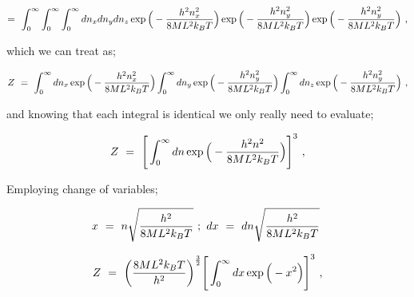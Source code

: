 \documentclass{article}
\begin{document}
\begin{equation} \label{eq:256}
= \hspace{0.125cm} \int_{0}^{\infty} \int_{0}^{\infty} \int_{0}^{\infty} d n_x d n_y d n_z \exp{\Big(-\frac{h^2 n_x^2}{8 M L^2 k_B T} \Big)} \exp{\Big(-\frac{h^2 n_y^2}{8 M L^2 k_B T} \Big)} \exp{\Big(-\frac{h^2 n_y^2}{8 M L^2 k_B T} \Big)} \hspace{0.125cm} ,
\end{equation}

which we can treat as;

\begin{equation} \label{eq:256}
Z \hspace{0.125cm} = \hspace{0.125cm} \int_{0}^{\infty} d n_x \exp{\Big(-\frac{h^2 n_x^2}{8 M L^2 k_B T} \Big)} \int_{0}^{\infty} d n_y \exp{\Big(-\frac{h^2 n_y^2}{8 M L^2 k_B T} \Big)} \int_{0}^{\infty} d n_z \exp{\Big(-\frac{h^2 n_y^2}{8 M L^2 k_B T} \Big)} \hspace{0.125cm} ,
\end{equation}

and knowing that each integral is identical we only really need to evaluate;

\begin{equation} \label{eq:256}
Z \hspace{0.125cm} = \hspace{0.125cm} \Bigg[ \int_{0}^{\infty} d n \exp{\Big(-\frac{h^2 n^2}{8 M L^2 k_B T} \Big)} \Bigg]^3 \hspace{0.125cm} ,
\end{equation}

Employing change of variables;

\begin{equation} \label{eq:256}
x \hspace{0.125cm} = \hspace{0.125cm} n \sqrt{\frac{h^2}{8 M L^2 k_B T}} \hspace{0.125cm} ; \hspace{0.125cm} d x \hspace{0.125cm} = \hspace{0.125cm} d n \sqrt{\frac{h^2}{8 M L^2 k_B T}} \hspace{0.125cm}
\end{equation}

\begin{equation} \label{eq:256}
Z \hspace{0.125cm} = \hspace{0.125cm} \bigg( \frac{8 M L^2 k_B T}{h^2} \bigg)^{\frac{3}{2}} \Bigg[ \int_{0}^{\infty} d x \exp{\Big(-x^2 \Big)} \Bigg]^3 \hspace{0.125cm} ,
\end{equation}
\end{document}
